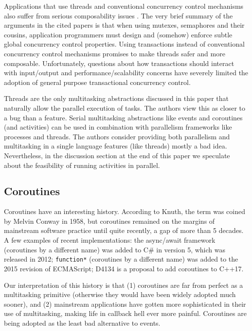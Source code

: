\documentclass[10pt,preprint]{sigplanconf}
\begin{document}
Applications that use threads and conventional concurrency control mechanisms also suffer from serious composability issues \cite{Harris2005, Grossman2007}.
The very brief summary of the arguments in the cited papers is that when using mutexes, semaphores and their cousins, application programmers must design and (somehow) enforce subtle global concurrency control properties.
Using transactions instead of conventional concurrency control mechanisms promises to make threads safer and more composable.
Unfortunately, questions about how transactions should interact with input/output and performance/scalability concerns have severely limited the adoption of general purpose transactional concurrency control.

Threads are the only multitasking abstractions discussed in this paper that naturally allow the parallel execution of tasks.
The authors view this as closer to a bug than a feature.
Serial multitasking abstractions like events and coroutines (and activities) can be used in combination with parallelism frameworks like processes and threads.
The authors consider providing both parallelism and multitasking in a single language features (like threads) mostly a bad idea.
Nevertheless, in the discussion section at the end of this paper we speculate about the feasibility of running activities in parallel.

\subsection{Coroutines}

Coroutines have an interesting history.
According to Knuth, the term was coined by Melvin Conway in 1958, but coroutines remained on the margins of mainstream software practice until quite recently, a gap of more than 5 decades.
A few examples of recent implementations: the async/await framework (coroutines by a different name) was added to C\# in version 5, which was released in 2012; \texttt{function*} (coroutines by a different name) was added to the 2015 revision of ECMAScript; D4134 is a proposal to add coroutines to C++17.

Our interpretation of this history is that (1) coroutines are far from perfect as a multitasking primitive (otherwise they would have been widely adopted much sooner), and (2) mainstream applications have gotten more sophisticated in their use of multitasking, making life in callback hell ever more painful.
Coroutines are being adopted as the least bad alternative to events.
\end{document}
